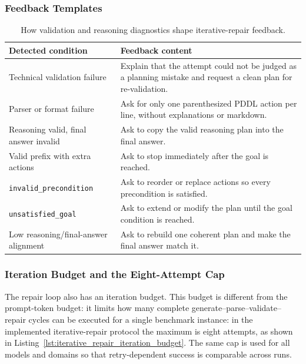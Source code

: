 \subsubsection{Feedback Templates}

\begin{table}[H]
\centering
\renewcommand{\arraystretch}{1.2}
\begin{tabularx}{\textwidth}{lX}
\toprule
\textbf{Detected condition} & \textbf{Feedback content} \\
\midrule
Technical validation failure & Explain that the attempt could not be judged as a planning mistake and request a clean plan for re-validation. \\
Parser or format failure & Ask for only one parenthesized PDDL action per line, without explanations or markdown. \\
Reasoning valid, final answer invalid & Ask to copy the valid reasoning plan into the final answer. \\
Valid prefix with extra actions & Ask to stop immediately after the goal is reached. \\
\texttt{invalid\_precondition} & Ask to reorder or replace actions so every precondition is satisfied. \\
\texttt{unsatisfied\_goal} & Ask to extend or modify the plan until the goal condition is reached. \\
Low reasoning/final-answer alignment & Ask to rebuild one coherent plan and make the final answer match it. \\
\bottomrule
\end{tabularx}
\caption{How validation and reasoning diagnostics shape iterative-repair feedback.}
\label{tab:repair-feedback-flow}
\end{table}

\subsubsection{Iteration Budget and the Eight-Attempt Cap}

The repair loop also has an iteration budget. This budget is different from the prompt-token budget: it limits how many complete generate--parse--validate--repair cycles can be executed for a single benchmark instance: in the implemented iterative-repair protocol the maximum is eight attempts, as shown in Listing~\ref{lst:iterative_repair_iteration_budget}. The same cap is used for all models and domains so that retry-dependent success is comparable across runs.

